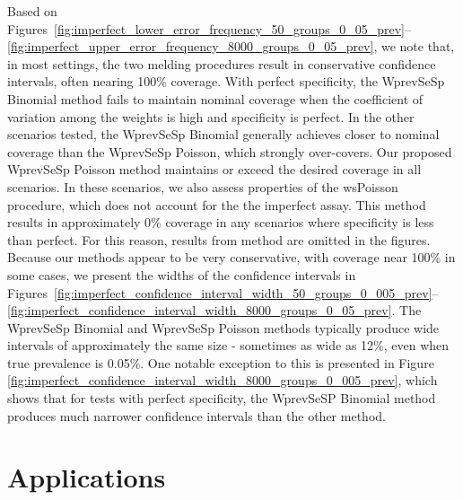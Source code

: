 \documentclass[AMA,STIX1COL]{WileyNJD-v2}
\begin{document}
Based on Figures~\ref{fig:imperfect_lower_error_frequency_50_groups_0_05_prev}--\ref{fig:imperfect_upper_error_frequency_8000_groups_0_05_prev}, we note that, in most settings, the two melding procedures result in conservative confidence intervals, often nearing 100\% coverage.
With perfect specificity, the WprevSeSp Binomial method fails to maintain nominal coverage when the coefficient of variation among the weights is high and specificity is perfect.
In the other scenarios tested, the WprevSeSp Binomial generally achieves closer to nominal coverage than the WprevSeSp Poisson, which strongly over-covers.
Our proposed WprevSeSp Poisson method maintains or exceed the desired coverage in all scenarios.
In these scenarios, we also assess properties of the wsPoisson procedure, which does not account for the the imperfect assay.
This method results in approximately 0\% coverage in any scenarios where specificity is less than perfect.
For this reason, results from method are omitted in the figures.
Because our methods appear to be very conservative, with coverage near 100\% in some cases, we present the widths of the confidence intervals in Figures~\ref{fig:imperfect_confidence_interval_width_50_groups_0_005_prev}--\ref{fig:imperfect_confidence_interval_width_8000_groups_0_05_prev}.
The WprevSeSp Binomial and  WprevSeSp Poisson methods typically produce wide intervals of approximately the same size - sometimes as wide as 12\%, even when true prevalence is 0.05\%.
One notable exception to this is presented in Figure \ref{fig:imperfect_confidence_interval_width_8000_groups_0_005_prev}, which shows that for tests with perfect specificity, the WprevSeSP Binomial method produces much narrower confidence intervals than the other method.

\section{Applications}
\label{sec-Application}
\end{document}
